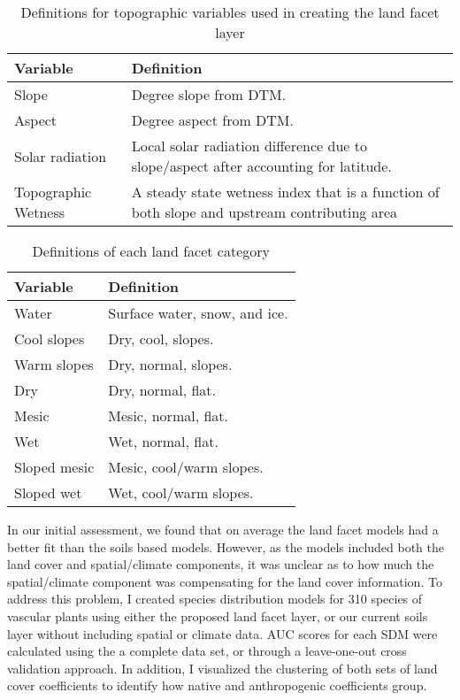 \documentclass[12pt]{article}
\begin{document}
\begin{table}[ht]
\centering
 \begin{tabular}{|p{4cm} | p{7cm} |} 
 \hline
 \textbf{Variable} & \textbf{Definition} \\
 \hline
 Slope & Degree slope from DTM. \\ 
 \hline
 Aspect & Degree aspect from DTM. \\ 
 \hline
 Solar radiation & Local solar radiation difference due to slope/aspect after accounting for latitude. \\ 
 \hline
 Topographic Wetness & A steady state wetness index that is a function of both slope and upstream contributing area \\
 \hline
\end{tabular}
\caption{Definitions for topographic variables used in creating the land facet layer \label{tab:topographic}}
\end{table}

\begin{table}[ht]
\centering
 \begin{tabular}{|p{4cm} | p{7cm} |} 
 \hline
 \textbf{Variable} & \textbf{Definition} \\
 \hline
 Water & Surface water, snow, and ice. \\ 
 \hline
 Cool slopes & Dry, cool, slopes. \\ 
 \hline
 Warm slopes & Dry, normal, slopes. \\ 
 \hline
 Dry & Dry, normal, flat. \\
 \hline
 Mesic & Mesic, normal, flat. \\
 \hline
 Wet & Wet, normal, flat. \\
 \hline
 Sloped mesic & Mesic, cool/warm slopes. \\
 \hline
 Sloped wet & Wet, cool/warm slopes. \\
 \hline
\end{tabular}
\caption{Definitions of each land facet category \label{tab:definitions}}
\end{table}

In our initial assessment, we found that on average the land facet models had a better fit than the soils based models. However, as the models included both the land cover and spatial/climate components, it was unclear as to how much the spatial/climate component was compensating for the land cover information. To address this problem, I created species distribution models for 310 species of vascular plants using either the proposed land facet layer, or our current soils layer without including spatial or climate data. AUC scores for each SDM were calculated using the a complete data set, or through a leave-one-out cross validation approach. In addition, I visualized the clustering of both sets of land cover coefficients to identify how native and anthropogenic coefficients group.
\end{document}
